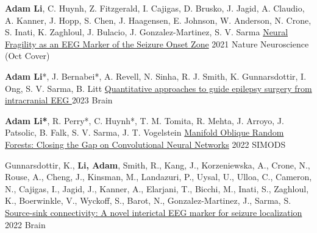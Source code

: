 \begin{cventries}

    \cvpresentation
    {\textbf{Adam Li}, C. Huynh, Z. Fitzgerald, I. Cajigas, D. Brusko, J. Jagid, A. Claudio, A. Kanner, J. Hopp, S. Chen, J. Haagensen, E. Johnson, W. Anderson, N. Crone, S. Inati, K. Zaghloul, J. Bulacio, J. Gonzalez-Martinez, S. V. Sarma} %
    {\href{https://www.biorxiv.org/content/10.1101/862797v6}{Neural Fragility as an EEG Marker of the Seizure Onset Zone}} %
    {2021} %
    {Nature Neuroscience (Oct Cover)} %
    {\empty}
    {\empty}
    \vspace{-0.9cm}

    \cvpresentation
    {\textbf{Adam Li}*, J. Bernabei*, A. Revell, N. Sinha, R. J. Smith, K. Gunnarsdottir, I. Ong, S. V. Sarma, B. Litt} %
    {\href{https://doi.org/10.1093/brain/awad007}{Quantitative approaches to guide epilepsy surgery from intracranial EEG }} %
    {2023} %
    {Brain} %
    {\empty}
    {\empty}
    \vspace{-0.9cm}
    
    \cvpresentation
    {\textbf{Adam Li*}, R. Perry*, C. Huynh*, T. M. Tomita, R. Mehta, J. Arroyo, J. Patsolic, B. Falk, S. V. Sarma, J. T. Vogelstein} %
    {\href{https://arxiv.org/abs/1909.11799}{Manifold Oblique Random Forests: Closing the Gap on Convolutional Neural Networks}} %
    {2022} %
    {SIMODS} %
    {\empty}
    {\empty}
    \vspace{-0.9cm}
    
    \cvpresentation
    {Gunnarsdottir, K., \textbf{Li, Adam}, Smith, R., Kang, J., Korzeniewska, A., Crone, N., Rouse, A., Cheng, J., Kinsman, M., Landazuri, P., Uysal, U., Ulloa, C., Cameron, N., Cajigas, I., Jagid, J., Kanner, A., Elarjani, T., Bicchi, M., Inati, S., Zaghloul, K., Boerwinkle, V., Wyckoff, S., Barot, N., Gonzalez-Martinez, J., Sarma, S.} %
    {\href{https://www.biorxiv.org/content/10.1101/2021.10.15.464594v1}{Source-sink connectivity: A novel interictal EEG marker for seizure localization}} %
    {2022} %
    {Brain} %
    {\empty}
    {\empty}
    \vspace{-0.9cm}
    

\end{cventries}
